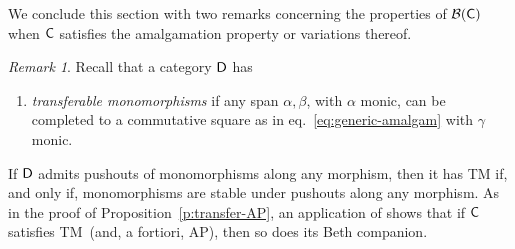 \documentclass[a4paper,10pt,reqno]{amsart}
\theoremstyle{definition}
\theoremstyle{remark}
\newtheorem{remark}[theorem]{Remark}
\newcommand{\cat}{{\sf C}}								%
\newcommand{\catt}{{\sf D}}								%
\newcommand{\B}[1]{\mathcal{B}(#1)}						%
\newcommand{\AP}{\textnormal{AP}}
\newcommand{\TM}{\textnormal{TM}}
\begin{document}
We conclude this section with two remarks concerning the properties of $\B{\cat}$ when $\cat$ satisfies the amalgamation property or variations thereof.

\begin{remark}\label{r:TM}
Recall that a category $\catt$ has
\begin{enumerate}
\item[(TM)]\label{TM} \emph{transferable monomorphisms} if any span $\alpha,\beta$, with $\alpha$ monic, can be completed to a commutative square as in eq.~\eqref{eq:generic-amalgam} with $\gamma$ monic.
\end{enumerate}
If $\catt$ admits pushouts of monomorphisms along any morphism, then it has TM if, and only if, monomorphisms are stable under pushouts along any morphism. As in the proof of Proposition~\ref{p:transfer-AP}, an application of \cite[Lemma~1]{Ringel1971} shows that if $\cat$ satisfies \TM~(and, a fortiori, \AP), then so does its Beth companion.
\end{remark}
\end{document}
